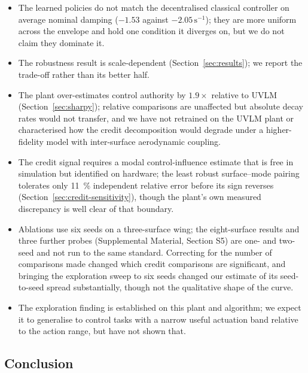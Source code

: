 \documentclass[journal]{new-aiaa}
\begin{document}
\begin{itemize}
\item The learned policies do not match the decentralised classical
controller on average nominal damping ($-1.53$ against
$-2.05\,\mathrm{s}^{-1}$); they are more uniform across the envelope and
hold one condition it diverges on, but we do not claim they dominate it.
\item The robustness result is scale-dependent (Section~\ref{sec:results});
we report the trade-off rather than its better half.
\item The plant over-estimates control authority by $1.9\times$ relative to
UVLM (Section~\ref{sec:sharpy}); relative comparisons are unaffected but
absolute decay rates would not transfer, and we have not retrained on the
UVLM plant or characterised how the credit decomposition would degrade
under a higher-fidelity model with inter-surface aerodynamic coupling.
\item The credit signal requires a modal control-influence estimate that is
free in simulation but identified on hardware; the least robust
surface--mode pairing tolerates only \SI{11}{\percent} independent
relative error before its sign reverses (Section~\ref{sec:credit-sensitivity}),
though the plant's own measured discrepancy is well clear of that
boundary.
\item Ablations use six seeds on a three-surface wing; the eight-surface
results and three further probes (Supplemental Material, Section S5) are
one- and two-seed and not run to the same standard. Correcting for the
number of
comparisons made changed which credit comparisons are significant, and
bringing the exploration sweep to six seeds changed our estimate of its
seed-to-seed spread substantially, though not the qualitative shape of the
curve.
\item The exploration finding is established on this plant and algorithm;
we expect it to generalise to control tasks with a narrow useful actuation
band relative to the action range, but have not shown that.
\end{itemize}

\subsection{Conclusion}
\end{document}
